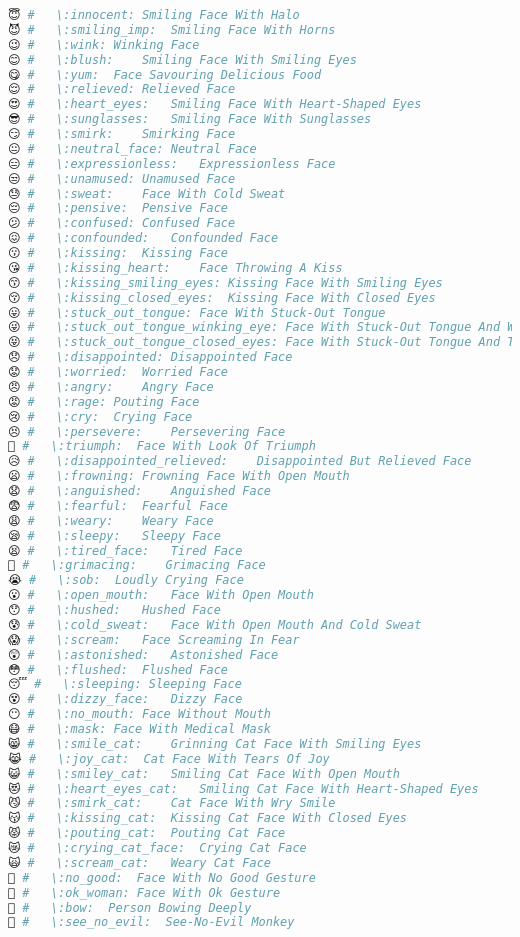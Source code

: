 \begin{lstlisting}[language=Julia]
😇 #   \:innocent: Smiling Face With Halo
😈 #   \:smiling_imp:  Smiling Face With Horns
😉 #   \:wink: Winking Face
😊 #   \:blush:    Smiling Face With Smiling Eyes
😋 #   \:yum:  Face Savouring Delicious Food
😌 #   \:relieved: Relieved Face
😍 #   \:heart_eyes:   Smiling Face With Heart-Shaped Eyes
😎 #   \:sunglasses:   Smiling Face With Sunglasses
😏 #   \:smirk:    Smirking Face
😐 #   \:neutral_face: Neutral Face
😑 #   \:expressionless:   Expressionless Face
😒 #   \:unamused: Unamused Face
😓 #   \:sweat:    Face With Cold Sweat
😔 #   \:pensive:  Pensive Face
😕 #   \:confused: Confused Face
😖 #   \:confounded:   Confounded Face
😗 #   \:kissing:  Kissing Face
😘 #   \:kissing_heart:    Face Throwing A Kiss
😙 #   \:kissing_smiling_eyes: Kissing Face With Smiling Eyes
😚 #   \:kissing_closed_eyes:  Kissing Face With Closed Eyes
😛 #   \:stuck_out_tongue: Face With Stuck-Out Tongue
😜 #   \:stuck_out_tongue_winking_eye: Face With Stuck-Out Tongue And Winking Eye
😝 #   \:stuck_out_tongue_closed_eyes: Face With Stuck-Out Tongue And Tightly-Closed Eyes
😞 #   \:disappointed: Disappointed Face
😟 #   \:worried:  Worried Face
😠 #   \:angry:    Angry Face
😡 #   \:rage: Pouting Face
😢 #   \:cry:  Crying Face
😣 #   \:persevere:    Persevering Face
😤 #   \:triumph:  Face With Look Of Triumph
😥 #   \:disappointed_relieved:    Disappointed But Relieved Face
😦 #   \:frowning: Frowning Face With Open Mouth
😧 #   \:anguished:    Anguished Face
😨 #   \:fearful:  Fearful Face
😩 #   \:weary:    Weary Face
😪 #   \:sleepy:   Sleepy Face
😫 #   \:tired_face:   Tired Face
😬 #   \:grimacing:    Grimacing Face
😭 #   \:sob:  Loudly Crying Face
😮 #   \:open_mouth:   Face With Open Mouth
😯 #   \:hushed:   Hushed Face
😰 #   \:cold_sweat:   Face With Open Mouth And Cold Sweat
😱 #   \:scream:   Face Screaming In Fear
😲 #   \:astonished:   Astonished Face
😳 #   \:flushed:  Flushed Face
😴 #   \:sleeping: Sleeping Face
😵 #   \:dizzy_face:   Dizzy Face
😶 #   \:no_mouth: Face Without Mouth
😷 #   \:mask: Face With Medical Mask
😸 #   \:smile_cat:    Grinning Cat Face With Smiling Eyes
😹 #   \:joy_cat:  Cat Face With Tears Of Joy
😺 #   \:smiley_cat:   Smiling Cat Face With Open Mouth
😻 #   \:heart_eyes_cat:   Smiling Cat Face With Heart-Shaped Eyes
😼 #   \:smirk_cat:    Cat Face With Wry Smile
😽 #   \:kissing_cat:  Kissing Cat Face With Closed Eyes
😾 #   \:pouting_cat:  Pouting Cat Face
😿 #   \:crying_cat_face:  Crying Cat Face
🙀 #   \:scream_cat:   Weary Cat Face
🙅 #   \:no_good:  Face With No Good Gesture
🙆 #   \:ok_woman: Face With Ok Gesture
🙇 #   \:bow:  Person Bowing Deeply
🙈 #   \:see_no_evil:  See-No-Evil Monkey

\end{lstlisting}
